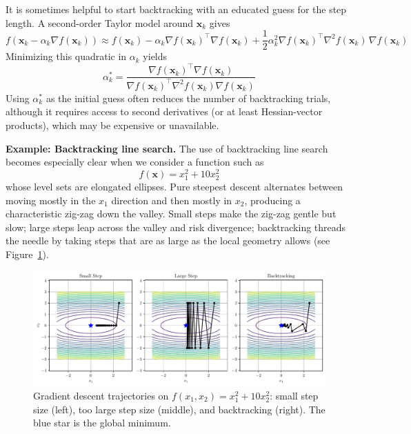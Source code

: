 It is sometimes helpful to start backtracking with an educated guess for the step length. A second-order Taylor model around $\mathbf{x}_k$ gives
\begin{equation}
f(\mathbf{x}_k-\alpha_k\nabla f(\mathbf{x}_k))
\approx
f(\mathbf{x}_k)
-\alpha_k \nabla f(\mathbf{x}_k)^{\top}\nabla f(\mathbf{x}_k)
+\frac{1}{2}\alpha_k^{2} \nabla f(\mathbf{x}_k)^{\top}\nabla^2 f(\mathbf{x}_k)\,\nabla f(\mathbf{x}_k)
\end{equation}
Minimizing this quadratic in $\alpha_k$ yields
\begin{equation}
\alpha_k^\ast
=
\frac{\nabla f(\mathbf{x}_k)^{\top}\nabla f(\mathbf{x}_k)}{\nabla f(\mathbf{x}_k)^{\top}\nabla^2 f(\mathbf{x}_k)\nabla f(\mathbf{x}_k)}
\end{equation}
Using $\alpha_k^\ast$ as the initial guess often reduces the number of backtracking trials, although it requires access to second derivatives (or at least Hessian-vector products), which may be expensive or unavailable.

\begin{exampleBox}
\textbf{Example: Backtracking line search.}
    The use of backtracking line search becomes especially clear when we consider a function such as
    \[
    f(\mathbf{x}) = x_1^2 + 10x_2^2
    \]
    whose level sets are elongated ellipses. Pure steepest descent alternates between moving mostly in the $x_1$ direction and then mostly in $x_2$, producing a characteristic zig-zag down the valley. Small steps make the zig-zag gentle but slow; large steps leap across the valley and risk divergence; backtracking threads the needle by taking steps that are as large as the local geometry allows (see Figure~\ref{fig:anisotropic}).

    \begin{figure}[H]
        \centering
        \includegraphics[width=.98\textwidth]{figs/optimization/backtracking_example.pdf}
        \caption{Gradient descent trajectories on $f(x_1,x_2)=x_1^2+10x_2^2$: 
        small step size (left), too large step size (middle), and backtracking (right). The blue star is the global minimum.}
        \label{fig:anisotropic}
    \end{figure}

\end{exampleBox}

